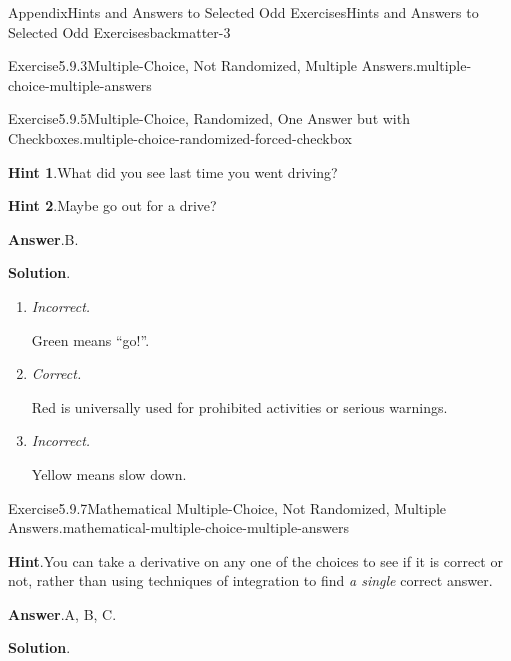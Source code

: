 \documentclass[oneside,10pt,]{book}
\newcommand{\blocktitlefont}{\relax}
\newcommand{\lititle}[1]{{\slshape#1}}
\numberwithin{equation}{section}
\begin{document}
\begin{solutions-chapter}{Appendix}{Hints and Answers to Selected Odd Exercises}{}{Hints and Answers to Selected Odd Exercises}{}{}{backmatter-3}
\begin{divisionsolution}{Exercise}{5.9.3}{Multiple-Choice, Not Randomized, Multiple Answers.}{multiple-choice-multiple-answers}
\begin{enumerate}[label={\Alph*.}]
\end{enumerate}
%
\end{divisionsolution}%
\begin{divisionsolution}{Exercise}{5.9.5}{Multiple-Choice, Randomized, One Answer but with Checkboxes.}{multiple-choice-randomized-forced-checkbox}%
\par\smallskip%
\noindent\textbf{\blocktitlefont Hint 1}.\hypertarget{multiple-choice-randomized-forced-checkbox-4-back}{}\quad{}What did you see last time you went driving?%
\par\smallskip%
\noindent\textbf{\blocktitlefont Hint 2}.\hypertarget{multiple-choice-randomized-forced-checkbox-5-back}{}\quad{}Maybe go out for a drive?%
\par\smallskip%
\noindent\textbf{\blocktitlefont Answer}.\hypertarget{multiple-choice-randomized-forced-checkbox-6-back}{}\quad{}B.%
\par\smallskip%
\noindent\textbf{\blocktitlefont Solution}.\hypertarget{multiple-choice-randomized-forced-checkbox-7-back}{}\quad{}%
\begin{enumerate}[label={\Alph*.}]
\item{}\lititle{Incorrect.}\par%
Green means ``go!''.%
\item{}\lititle{Correct.}\par%
Red is universally used for prohibited activities or serious warnings.%
\item{}\lititle{Incorrect.}\par%
Yellow means slow down.%
\end{enumerate}
%
\end{divisionsolution}%
\begin{divisionsolution}{Exercise}{5.9.7}{Mathematical Multiple-Choice, Not Randomized, Multiple Answers.}{mathematical-multiple-choice-multiple-answers}%
\par\smallskip%
\noindent\textbf{\blocktitlefont Hint}.\hypertarget{mathematical-multiple-choice-multiple-answers-4-back}{}\quad{}You can take a derivative on any one of the choices to see if it is correct or not, rather than using techniques of integration to find \emph{a single} correct answer.%
\par\smallskip%
\noindent\textbf{\blocktitlefont Answer}.\hypertarget{mathematical-multiple-choice-multiple-answers-5-back}{}\quad{}A, B, C.%
\par\smallskip%
\noindent\textbf{\blocktitlefont Solution}.\hypertarget{mathematical-multiple-choice-multiple-answers-6-back}{}\quad{}%

\end{divisionsolution}
\end{solutions-chapter}
\end{document}
